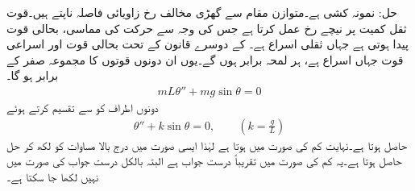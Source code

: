 حل:\quad {} نمونہ کشی ہے۔متوازن مقام سے گھڑی مخالف رخ زاویائی فاصلہ  ناپتے ہیں۔قوت ثقل  کمیت پر نیچے رخ عمل کرتا ہے جس کی وجہ سے حرکت کی مماسی، بحالی قوت   پیدا ہوتی ہے جہاں  ثقلی اسراع ہے۔ کے دوسرے قانون کے تحت بحالی قوت اور اسراعی  قوت  جہاں  اسراع ہے، ہر لمحہ برابر ہوں گے۔یوں ان دونوں قوتوں کا مجموعہ صفر کے برابر ہو گا۔
\begin{align*}
mL\theta''+mg\sin \theta=0
\end{align*}
دونوں اطراف کو  سے تقسیم کرتے ہوئے
\begin{align}\label{مساوات_نظام_غیر_خطی_ترکیب_مرحلہ_ت}
\theta''+k\sin \theta=0,\quad \quad \left(k=\frac{g}{L}\right)
\end{align}
حاصل ہوتا ہے۔نہایت کم  کی صورت میں  ہوتا ہے لہٰذا ایسی صورت میں درج بالا مساوات کو  لکھ کر حل  حاصل ہوتا ہے۔یہ کم  کی صورت میں تقریباً درست جواب ہے البتہ بالکل درست جواب  کی صورت میں نہیں لکھا جا سکتا ہے۔

